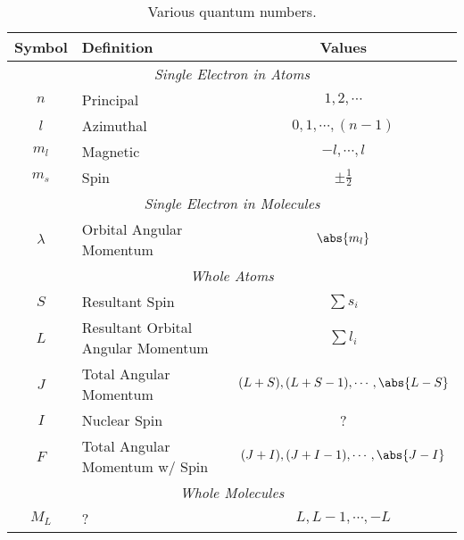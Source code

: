 \documentclass[11pt, twoside, fleqn]{report}
\begin{document}
\begin{table}[H]
    \centering
    \caption{Various quantum numbers.}
    \label{t:quantum_numbers}
    \begin{tabular}{clc}
        \toprule
        Symbol    & Definition                            & Values                                      \\
        \midrule
        \multicolumn{3}{c}{\textit{Single Electron in Atoms}}                                           \\
        \cmidrule(lr){1-3}
        $n$       & Principal                             & $1, 2, \dotsb$                              \\
        $l$       & Azimuthal                             & $0, 1, \dotsb, (n - 1)$                     \\
        $m_l$   & Magnetic                              & $-l, \dotsb, l$                             \\
        $m_s$   & Spin                                  & $\pm \frac{1}{2}$                           \\
        \multicolumn{3}{c}{\textit{Single Electron in Molecules}}                                       \\
        \cmidrule(lr){1-3}
        $\lambda$ & Orbital Angular Momentum              & $\abs{m_l}$                               \\
        \multicolumn{3}{c}{\textit{Whole Atoms}}                                                        \\
        \cmidrule(lr){1-3}
        $S$       & Resultant Spin                        & $\sum s_i$                                \\
        $L$       & Resultant Orbital Angular Momentum    & $\sum l_i$                                \\
        $J$       & Total Angular Momentum                & $(L + S), (L + S - 1), \dotsb, \abs{L - S}$ \\
        $I$       & Nuclear Spin                          & ?                                           \\
        $F$       & Total Angular Momentum w/ Spin        & $(J + I), (J + I - 1), \dotsb, \abs{J - I}$ \\
        \multicolumn{3}{c}{\textit{Whole Molecules}}                                                    \\
        \cmidrule(lr){1-3}
        $M_L$   & ?                                     & $L, L - 1, \dotsb, -L$                      \\

\end{tabular}
\end{table}
\end{document}
